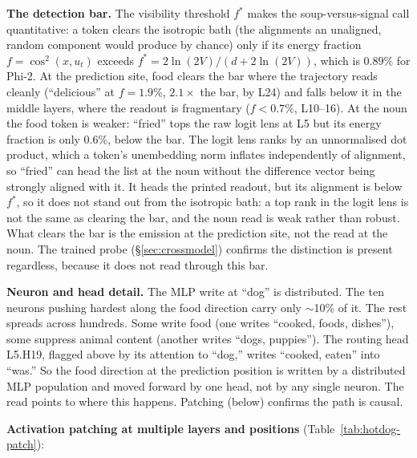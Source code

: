 \documentclass[11pt]{article}
\begin{document}
\textbf{The detection bar.} The visibility threshold $f^{*}$
\citep{tuomi2026visibility} makes the soup-versus-signal call quantitative: a
token clears the isotropic bath (the alignments an unaligned, random component
would produce by chance) only if its energy fraction $f = \cos^{2}(x,
u_t)$ exceeds $f^{*} = 2\ln(2V)/(d + 2\ln(2V))$, which is $0.89\%$ for Phi-2. At
the prediction site, food clears the bar where the trajectory reads cleanly
(``delicious'' at $f = 1.9\%$, $2.1\times$ the bar, by L24) and falls below it in
the middle layers, where the readout is fragmentary ($f < 0.7\%$, L10--16). At
the noun the food token is weaker: ``fried'' tops the raw logit lens at L5 but
its energy fraction is only $0.6\%$, below the bar. The logit lens ranks by an
unnormalised dot product, which a token's unembedding norm inflates independently
of alignment, so ``fried'' can head the list at the noun without the difference
vector being strongly aligned with it. It heads the printed readout, but its
alignment is below $f^{*}$, so it does not stand out from the isotropic bath: a
top rank in the logit lens is not the same as clearing the bar, and the noun read
is weak rather than robust. What clears the bar is the emission at the prediction
site, not the read at the noun. The trained probe
(\S\ref{sec:crossmodel}) confirms the distinction is present regardless, because
it does not read through this bar.

\textbf{Neuron and head detail.} The MLP write at ``dog'' is distributed. The
ten neurons pushing hardest along the food direction carry only $\sim$10\% of
it. The rest spreads across hundreds. Some write food (one writes ``cooked,
foods, dishes''), some suppress animal content (another writes ``dogs,
puppies''). The routing head L5.H19, flagged above by its attention to ``dog,''
writes ``cooked, eaten'' into ``was.'' So the food direction at the prediction
position is written by a distributed MLP population and moved forward by one
head, not by any single neuron. The read points to where this happens. Patching
(below) confirms the path is causal.

\textbf{Activation patching at multiple layers and positions} (Table~\ref{tab:hotdog-patch}):
\end{document}
